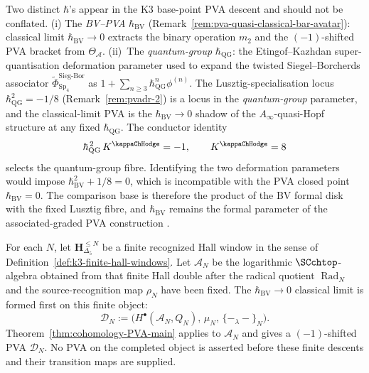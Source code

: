 \begin{remark}
\label{rem:pvadr-two-hbar-bridge}
Two distinct $\hbar$'s appear in the K3 base-point PVA descent and should not
be conflated. (i) The \emph{BV--PVA} $\hbar_{\mathrm{BV}}$
(Remark~\ref{rem:pva-quasi-classical-bar-avatar}): classical limit
$\hbar_{\mathrm{BV}}\to 0$ extracts the binary operation $m_2$ and the
$(-1)$-shifted PVA bracket from $\Theta_{\mathcal A}$.
(ii)~The \emph{quantum-group} $\hbar_{\mathrm{QG}}$: the Etingof--Kazhdan
super-quantisation deformation parameter used to expand the twisted
Siegel--Borcherds associator
$\widetilde\Phi^{\mathrm{Sieg\text{-}Bor}}_{\mathrm{Sp}_4}$
as $1 + \sum_{n\ge 3}\hbar_{\mathrm{QG}}^n \phi^{(n)}$. The
Lusztig-specialisation locus $\hbar_{\mathrm{QG}}^2 = -1/8$
(Remark~\ref{rem:pvadr-2}) is a locus in the \emph{quantum-group}
parameter, and the classical-limit PVA is the
$\hbar_{\mathrm{BV}}\to 0$ shadow of the $A_\infty$-quasi-Hopf
structure at any fixed $\hbar_{\mathrm{QG}}$. The conductor identity
\[
 \hbar_{\mathrm{QG}}^{\,2}\,K^{\kappaChHodge}=-1,\qquad
 K^{\kappaChHodge}=8
\]
selects the quantum-group fibre. Identifying the two deformation
parameters would impose
$\hbar_{\mathrm{BV}}^2+1/8=0$, which is incompatible with the PVA
closed point $\hbar_{\mathrm{BV}}=0$. The comparison base is therefore
the product of the BV formal disk with the fixed Lusztig fibre, and
$\hbar_{\mathrm{BV}}$ remains the formal parameter of the
associated-graded PVA construction
\cite{EtingofKazhdan2000,Lusztig1990}.
\end{remark}

\begin{remark}
\label{rem:pvadr-classical-limit}
For each $N$, let $\mathbf H_{\Delta_5}^{\le N}$ be a finite
recognized Hall window in the sense of
Definition~\ref{def:k3-finite-hall-windows}.  Let
$\mathcal A_N$ be the logarithmic $\SCchtop$-algebra obtained from
that finite Hall double after the radical quotient
$\operatorname{Rad}_N$ and the source-recognition map $\rho_N$ have
been fixed.  The $\hbar_{\mathrm{BV}}\to0$ classical limit is formed
first on this finite object:
\[
 \mathcal D_N
 :=
 \bigl(
 H^\bullet(\mathcal A_N,Q_N),\,
 \mu_N,\,
 \{-_\lambda-\}_N
 \bigr).
\]
Theorem~\ref{thm:cohomology-PVA-main} applies to $\mathcal A_N$ and
gives a $(-1)$-shifted PVA $\mathcal D_N$.  No PVA on the completed
object is asserted before these finite descents and their transition
maps are supplied.
\end{remark}

